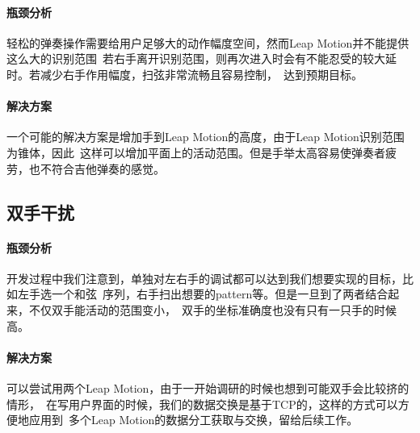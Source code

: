             \paragraph{瓶颈分析}
            轻松的弹奏操作需要给用户足够大的动作幅度空间，然而Leap Motion并不能提供这么大的识别范围\
            若右手离开识别范围，则再次进入时会有不能忍受的较大延时。若减少右手作用幅度，扫弦非常流畅且容易控制，\
            达到预期目标。

            \paragraph{解决方案}
            一个可能的解决方案是增加手到Leap Motion的高度，由于Leap Motion识别范围为锥体，因此\
            这样可以增加平面上的活动范围。但是手举太高容易使弹奏者疲劳，也不符合吉他弹奏的感觉。

        \subsection{双手干扰}
            \paragraph{瓶颈分析}
            开发过程中我们注意到，单独对左右手的调试都可以达到我们想要实现的目标，比如左手选一个和弦\
            序列，右手扫出想要的pattern等。但是一旦到了两者结合起来，不仅双手能活动的范围变小，\
            双手的坐标准确度也没有只有一只手的时候高。

            \paragraph{解决方案}
            可以尝试用两个Leap Motion，由于一开始调研的时候也想到可能双手会比较挤的情形，\
            在写用户界面的时候，我们的数据交换是基于TCP的，这样的方式可以方便地应用到\
            多个Leap Motion的数据分工获取与交换，留给后续工作。

